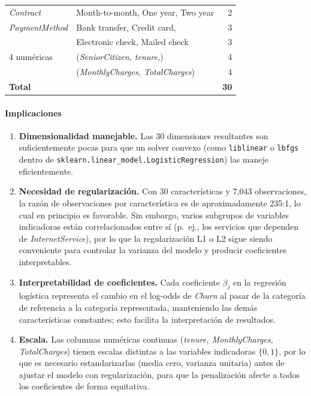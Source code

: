 \documentclass[spanish]{article}
\begin{document}
\begin{center}
\begin{tabular}{llr}
\textit{Contract}         & Month-to-month, One year, Two year      & 2 \\
\textit{PaymentMethod}    & Bank transfer, Credit card,  & 3 \\
                          & Electronic check, Mailed check & 3 \\
\midrule
4 numéricas               & (\textit{SeniorCitizen, tenure,}) & 4 \\
                          & (\textit{MonthlyCharges, TotalCharges}) & 4 \\
\midrule
\textbf{Total}            &                                         & \textbf{30} \\
\bottomrule
\end{tabular}
\end{center}

\paragraph{Implicaciones}

\begin{enumerate}
   \item \textbf{Dimensionalidad manejable.} Las 30 dimensiones resultantes son suficientemente pocas para que un solver convexo (como \texttt{liblinear} o \texttt{lbfgs} dentro de \texttt{sklearn.linear\_model.LogisticRegression}) las maneje eficientemente.
   \item \textbf{Necesidad de regularización.} Con 30 características y 7{,}043 observaciones, la razón de observaciones por característica es de aproximadamente 235:1, lo cual en principio es favorable. Sin embargo, varios subgrupos de variables indicadoras están correlacionados entre sí (p.~ej., los servicios que dependen de \textit{InternetService}), por lo que la regularización L1 o L2 sigue siendo conveniente para controlar la varianza del modelo y producir coeficientes interpretables.
   \item \textbf{Interpretabilidad de coeficientes.} Cada coeficiente $\beta_j$ en la regresión logística representa el cambio en el log-odds de \textit{Churn} al pasar de la categoría de referencia a la categoría representada, manteniendo las demás características constantes; esto facilita la interpretación de resultados.
   \item \textbf{Escala.} Las columnas numéricas continuas (\textit{tenure, MonthlyCharges, TotalCharges}) tienen escalas distintas a las variables indicadoras $\{0,1\}$, por lo que es necesario estandarizarlas (media cero, varianza unitaria) antes de ajustar el modelo con regularización, para que la penalización afecte a todos los coeficientes de forma equitativa.
\end{enumerate}
\end{document}
